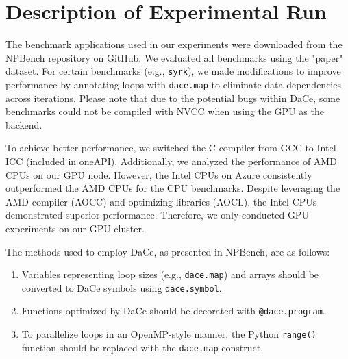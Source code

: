 \section{Description of Experimental Run}
\label{sec:exp-run}

The benchmark applications used in our experiments were downloaded from the NPBench repository on GitHub. We evaluated all benchmarks using the "paper" dataset. For certain benchmarks (e.g., \texttt{syrk}), we made modifications to improve performance by annotating loops with \texttt{dace.map} to eliminate data dependencies across iterations. Please note that due to the potential bugs within DaCe, some benchmarks could not be compiled with NVCC when using the GPU as the backend. 

To achieve better performance, we switched the C compiler from GCC to Intel ICC (included in oneAPI). Additionally, we analyzed the performance of AMD CPUs on our GPU node. However, the Intel CPUs on Azure consistently outperformed the AMD CPUs for the CPU benchmarks. Despite leveraging the AMD compiler (AOCC) and optimizing libraries (AOCL), the Intel CPUs demonstrated superior performance. Therefore, we only conducted GPU experiments on our GPU cluster.

The methods used to employ DaCe, as presented in NPBench, are as follows:
\begin{enumerate}
    \item Variables representing loop sizes (e.g., \texttt{dace.map}) and arrays should be converted to DaCe symbols using \texttt{dace.symbol}.
    \item Functions optimized by DaCe should be decorated with \texttt{@dace.program}.
    \item To parallelize loops in an OpenMP-style manner, the Python \texttt{range()} function should be replaced with the \texttt{dace.map} construct.
\end{enumerate}